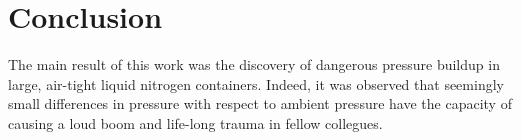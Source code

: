 \section{Conclusion}
The main result of this work was the discovery of dangerous pressure buildup in large, air-tight liquid nitrogen containers.
Indeed, it was observed that seemingly small differences in pressure with respect to ambient pressure have the capacity of causing a loud boom and life-long trauma in fellow collegues.